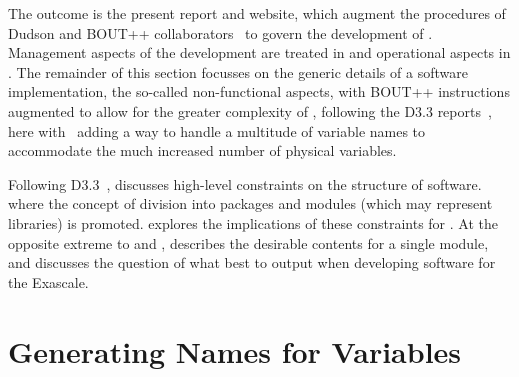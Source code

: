 The outcome is the present report and website, which augment the procedures of
Dudson and BOUT++ collaborators~\cite{y3re314}  to govern the development of \nep.
Management aspects of the development are treated in  and
operational aspects in . The remainder of this section focusses
on the generic details of a software implementation, the so-called
non-functional aspects,  with BOUT++ instructions
augmented to allow for the greater complexity of \nep, following the D3.3
reports~\cite{y2d33}, here with~ adding a way to handle a multitude of variable
names to accommodate the much increased number of physical variables.






Following D3.3~\cite{y2d33},  discusses high-level constraints on the structure of software.
where the concept of division into packages and modules (which may represent libraries)  is promoted.
 explores the implications of these constraints for \nep.
At the opposite extreme to  and ,
 describes the desirable contents for a single module,
and  discusses the question of what best to output when developing 
software for the Exascale.





\section{Generating Names for Variables}\label{sec:TS_varnames}

